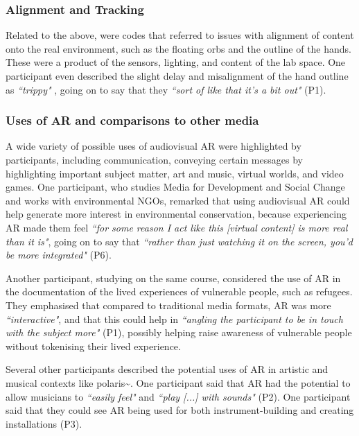 \subsubsection{Alignment and Tracking}\label{sec: polaris-feedback-adoption-alignment}
Related to the above, were codes that referred to issues with alignment of content onto the real environment, such as the floating orbs and the outline of the hands. These were a product of the sensors, lighting, and content of the lab space. One participant even described the slight delay and misalignment of the hand outline as \textit{``trippy"} , going on to say that they \textit{``sort of like that it’s a bit out"} (P1).

\subsubsection{Uses of AR and comparisons to other media}\label{sec: polaris-feedback-adoption-uses}
A wide variety of possible uses of audiovisual AR were highlighted by participants, including communication, conveying certain messages by highlighting important subject matter, art and music, virtual worlds, and video games.
One participant, who studies Media for Development and Social Change and works with environmental NGOs, remarked that using audiovisual AR could help generate more interest in environmental conservation, because experiencing AR made them feel \textit{``for some reason I act like this [virtual content] is more real than it is"}, going on to say that \textit{``rather than just watching it on the screen, you’d be more integrated"} (P6).

Another participant, studying on the same course, considered the use of AR in the documentation of the lived experiences of vulnerable people, such as refugees. They emphasised that compared to traditional media formats, AR was more \textit{``interactive"}, and that this could help in \textit{``angling the participant to be in touch with the subject more"} (P1), possibly helping raise awareness of vulnerable people without tokenising their lived experience.

Several other participants described the potential uses of AR in artistic and musical contexts like polaris\textasciitilde{}. One participant said that AR had the potential to allow musicians to \textit{``easily feel"} and \textit{``play [...] with sounds"} (P2). One participant said that they could see AR being used for both instrument-building and creating installations (P3).

